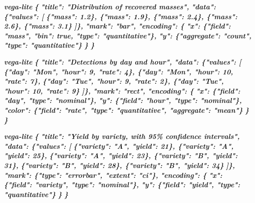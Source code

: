 \documentclass[
]{article}
\newenvironment{Shaded}{}{}
\newcommand{\InformationTok}[1]{\textcolor[rgb]{0.38,0.63,0.69}{\textbf{\textit{#1}}}}
\begin{document}
\begin{Shaded}
\begin{Highlighting}[]
\InformationTok{\textasciigrave{}\textasciigrave{}\textasciigrave{}vega{-}lite}
\InformationTok{\{}
\InformationTok{  "title": "Distribution of recovered masses",}
\InformationTok{  "data": \{"values": [}
\InformationTok{    \{"mass": 1.2\}, \{"mass": 1.9\}, \{"mass": 2.4\}, \{"mass": 2.6\}, \{"mass": 3.1\}}
\InformationTok{  ]\},}
\InformationTok{  "mark": "bar",}
\InformationTok{  "encoding": \{}
\InformationTok{    "x": \{"field": "mass", "bin": true, "type": "quantitative"\},}
\InformationTok{    "y": \{"aggregate": "count", "type": "quantitative"\}}
\InformationTok{  \}}
\InformationTok{\}}
\InformationTok{\textasciigrave{}\textasciigrave{}\textasciigrave{}}

\InformationTok{\textasciigrave{}\textasciigrave{}\textasciigrave{}vega{-}lite}
\InformationTok{\{}
\InformationTok{  "title": "Detections by day and hour",}
\InformationTok{  "data": \{"values": [}
\InformationTok{    \{"day": "Mon", "hour": 9, "rate": 4\}, \{"day": "Mon", "hour": 10, "rate": 7\},}
\InformationTok{    \{"day": "Tue", "hour": 9, "rate": 2\}, \{"day": "Tue", "hour": 10, "rate": 9\}}
\InformationTok{  ]\},}
\InformationTok{  "mark": "rect",}
\InformationTok{  "encoding": \{}
\InformationTok{    "x": \{"field": "day", "type": "nominal"\},}
\InformationTok{    "y": \{"field": "hour", "type": "nominal"\},}
\InformationTok{    "color": \{"field": "rate", "type": "quantitative", "aggregate": "mean"\}}
\InformationTok{  \}}
\InformationTok{\}}
\InformationTok{\textasciigrave{}\textasciigrave{}\textasciigrave{}}

\InformationTok{\textasciigrave{}\textasciigrave{}\textasciigrave{}vega{-}lite}
\InformationTok{\{}
\InformationTok{  "title": "Yield by variety, with 95\% confidence intervals",}
\InformationTok{  "data": \{"values": [}
\InformationTok{    \{"variety": "A", "yield": 21\}, \{"variety": "A", "yield": 25\},}
\InformationTok{    \{"variety": "A", "yield": 23\}, \{"variety": "B", "yield": 31\},}
\InformationTok{    \{"variety": "B", "yield": 28\}, \{"variety": "B", "yield": 34\}}
\InformationTok{  ]\},}
\InformationTok{  "mark": \{"type": "errorbar", "extent": "ci"\},}
\InformationTok{  "encoding": \{}
\InformationTok{    "x": \{"field": "variety", "type": "nominal"\},}
\InformationTok{    "y": \{"field": "yield", "type": "quantitative"\}}
\InformationTok{  \}}
\InformationTok{\}}
\InformationTok{\textasciigrave{}\textasciigrave{}\textasciigrave{}}


\end{Highlighting}
\end{Shaded}
\end{document}
